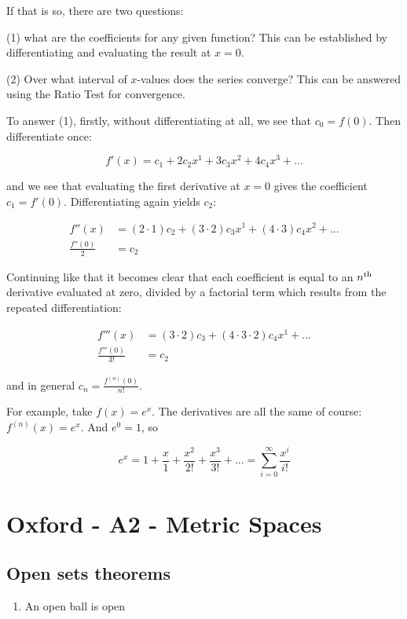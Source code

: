 If that is so, there are two questions:

(1) what are the coefficients for any given function? This can be established
by differentiating and evaluating the result at $x=0$.

(2) Over what interval of $x$-values does the series converge? This can be
answered using the Ratio Test for convergence.

To answer (1), firstly, without differentiating at all, we see that $c_0 = f(0)$. Then differentiate once:

$$
f'(x) = c_1 + 2c_2x^1 + 3c_3x^2 + 4c_4x^3 + ...
$$

and we see that evaluating the first derivative at $x=0$ gives the coefficient
$c_1 = f'(0)$. Differentiating again yields $c_2$:

\begin{align*}
f''(x) &= (2\cdot 1)c_2 + (3\cdot 2)c_3x^1 + (4\cdot 3)c_4x^2 + ... \\
\frac{f''(0)}{2} &= c_2
\end{align*}

Continuing like that it becomes clear that each coefficient is equal to an $n^{\text{th}}$ derivative evaluated at zero, divided by a factorial term which results from the repeated differentiation:

\begin{align*}
f'''(x) &= (3\cdot2)c_3 + (4\cdot3\cdot2)c_4x^1 + ... \\
\frac{f'''(0)}{3!} &= c_2
\end{align*}

and in general $c_n = \frac{f^{(n)}(0)}{n!}$.

For example, take $f(x) = e^x$. The derivatives are all the same of course: $f^{(n)}(x) = e^x$. And $e^0 = 1$, so

$$
e^x = 1 + \frac{x}{1} + \frac{x^2}{2!} + \frac{x^3}{3!} + ... = \sum_{i=0}^\infty \frac{x^i}{i!}
$$




\section{Oxford - A2 - Metric Spaces}

\subsection{Open sets theorems}
\begin{enumerate}
\item An open ball is open
\end{enumerate}

